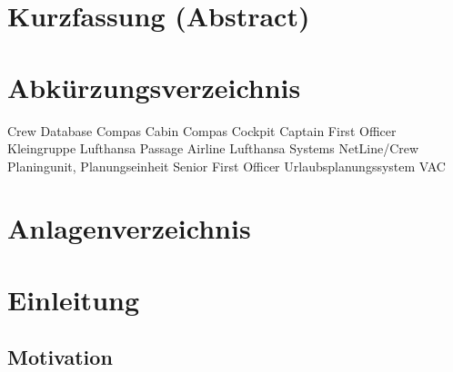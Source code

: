 \documentclass [12pt, a4paper, oneside, titlepage, ngerman]{article}
\begin{document}
\tableofcontents
\newpage


\section*{Kurzfassung (Abstract)}
\newpage


\section*{Abkürzungsverzeichnis}

\begin{acronym}

 {Crew Database}
 {Compas Cabin}
 {Compas Cockpit}
 {Captain}
 {First Officer}
 {Kleingruppe}
 {Lufthansa Passage Airline}
 {Lufthansa Systems}
 {NetLine/Crew}
 {Planingunit, Planungseinheit}
 {Senior First Officer}
 {Urlaubsplanungssystem VAC}


\end{acronym}
\newpage


\listoffigures
\newpage

\section*{Anlagenverzeichnis}
\newpage

\setcounter{page}{1}
\section{Einleitung}
\subsection {Motivation}
\end{document}
